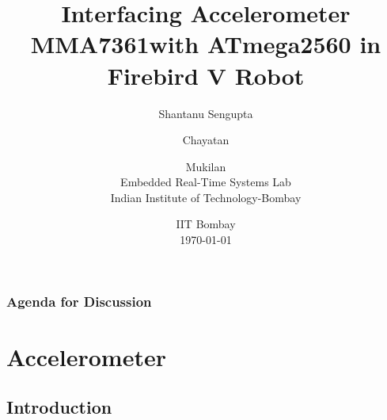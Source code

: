 \documentclass[table,10pt,red]{beamer}	%
\title
[
	e-Yantra	%
	\hspace{0.5cm}
	\insertframenumber/\inserttotalframenumber
]
{
	Interfacing Accelerometer MMA7361with ATmega2560 in Firebird V Robot
}
\author
[
	www.e-yantra.org 	%
]
{
	Shantanu Sengupta \and Chayatan \and Mukilan\\
\vspace{5mm}
  Embedded Real-Time Systems Lab\\
  Indian Institute of Technology-Bombay \\
}
\date
{
IIT Bombay \\ {\today}	%
}
\begin{document}

\begin{frame}	%
	\titlepage %
\end{frame}

\begin{frame}
	\frametitle{Agenda for Discussion} %
	\tableofcontents %
\end{frame}


\section{Accelerometer} %
\subsection{Introduction} %
\end{document}
